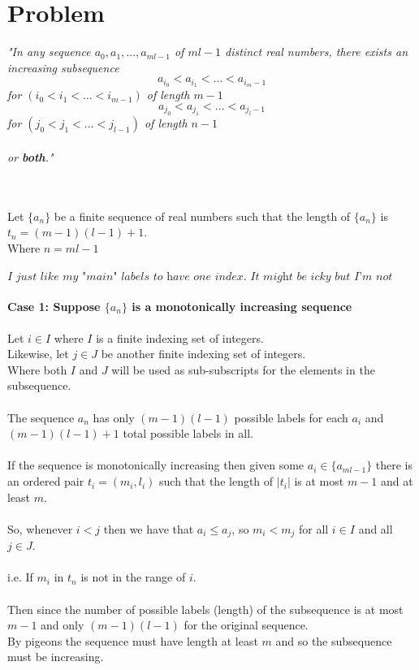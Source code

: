 \documentclass{article}
\begin{document}
\section*{Problem}  
  \textit{"In any sequence $a_{0},a_{1},\ldots ,a_{ml-1}$ of $ml-1$ distinct real numbers, there exists an increasing subsequence 
  $$a_{i_0} < a_{i_1} < \ldots < a_{i_m-1}$$ 
  for $(i_{0} < i_{1} < \ldots < i_{m-1})$ of length $m-1$
  $$a_{j_0} < a_{j_1} < \ldots < a_{j_l-1}$$ 
  for $(j_{0} < j_{1} < \ldots < j_{l-1})$
  of length $n-1$ 
  \\ \\ 
  or \textbf{both}."} 
  \bigskip
  
  \textbf{\pf} \\ \\
  Let $\{a_n\}$ be a finite sequence of real numbers such that the length of $\{a_n\}$ is $t_{n} = (m-1)(l-1)+1$.
  \\ 
  Where $n = ml-1$
  \\ \\
  \(\textit{I just like my "main" labels to have one index. It might be icky but I'm not sure yet.}\)
  \\ \\
  \textbf{Case 1: Suppose $\{a_{n}\}$ is a monotonically increasing sequence}
  \\ \\
  Let $i \in I$ where $I$ is a finite indexing set of integers.
  \\ 
  Likewise, let $j \in J$ be another finite indexing set of integers. 
  \\ 
  Where both $I$ and $J$ will be used as sub-subscripts for the elements in the subsequence. 
  \\ \\
  The sequence $a_{n}$ has only $(m-1)(l-1)$ possible labels for each $a_{i}$ and $(m-1)(l-1)+1$ total possible labels in all.
  \\ \\
  If the sequence is monotonically increasing then given some $a_{i} \in \{a_{ml-1}\}$ there is an ordered pair $t_{i} = (m_{i}, l_{i})$ such that the length of $|t_{i}|$ is at most $m-1$ and at least $m$.
  \\ \\ 
  So, whenever $i < j$ then we have that $a_{i} \leq a_{j}$, so $m_{i} < m_{j}$ for all $i \in I$ and all $j \in J$.
  \\ \\
  i.e. If $m_{i}$ in $t_{n}$ is not in the range of $i$.
  \\ \\
  Then since the number of possible labels (length) of the subsequence is at most $m-1$ and only $(m-1)(l-1)$ for the original sequence. 
  \\ 
  By pigeons the sequence must have length at least $m$ and so the subsequence must be increasing. 
  \bigskip
  
\end{document}
